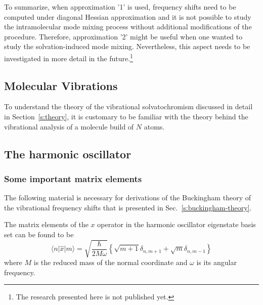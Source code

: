 \documentclass[a4paper,titlepage,twoside,fleqn,12pt]{book}
\begin{document}
\begin{refsection}
To summarize, when approximation '1'
is used, frequency shifts need to be computed under diagonal Hessian approximation
and it is not possible to study the intramolecular mode mixing process without additional 
modifications of the procedure. Therefore, approximation '2' might be useful when one
wanted to study the solvation\hyp{}induced mode mixing. Nevertheless, this aspect needs to
be investigated in more detail in the future.\footnote{The research presented here is not published yet.}


\printbibliography[heading=subbibintoc,title={References}]
\end{refsection}








\begin{appendices}

\chapter{Molecular Vibrations\label{a:vibrational-analysis}}

To understand the theory of the vibrational solvatochromism 
discussed in detail in Section~\ref{s:theory}, it is customary
to be familiar with the theory behind the vibrational analysis
of a molecule build of $N$ atoms.

\section{The harmonic oscillator\label{a:harmonic-oscillator}}

\subsection{Some important matrix elements\label{a:matrix-elements}}

The following material is necessary for derivations of the Buckingham theory
of the vibrational frequency shifts that is presented in Sec.~\ref{s:buckingham-theory}. 

The matrix elements of the $x$ operator in the harmonic oscillator eigenstate basis set
can be found to be
%
\begin{equation}
\label{ea:mxn}
\langle n \vert \hat{x} \vert m \rangle = 
\sqrt{
\frac{\hbar}{2M\omega}
}
\left\{ 
   \sqrt{m+1} \delta_{n,m+1} + \sqrt{m} \delta_{n,m-1}
\right\}
\end{equation}
%
\noindent where $M$ is the reduced mass of the normal coordinate and $\omega$ is its 
angular frequency.


\end{appendices}
\end{document}
